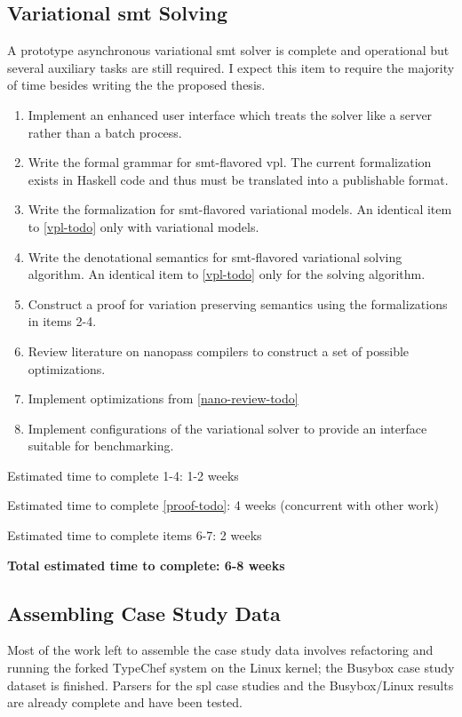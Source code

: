 \subsection{Variational \ac{smt} Solving}
A prototype asynchronous variational \ac{smt} solver is complete and operational
but several auxiliary tasks are still required. I expect this item to require
the majority of time besides writing the the proposed thesis.

\begin{enumerate}
\item\label{ui-todo} Implement an enhanced user interface which treats the
  solver like a server rather than a batch process.
\item\label{vpl-todo} Write the formal grammar for \ac{smt}-flavored \ac{vpl}.
  The current formalization exists in Haskell code and thus must be translated
  into a publishable format.
\item\label{vmodel-todo} Write the formalization for \ac{smt}-flavored variational models. An
  identical item to \autoref{vpl-todo} only with variational models.
\item \label{solve-todo} Write the denotational semantics for \ac{smt}-flavored
  variational solving algorithm. An identical item to \autoref{vpl-todo} only
  for the solving algorithm.
\item \label{proof-todo} Construct a proof for variation preserving semantics
  using the formalizations in items 2-4.
\item\label{nano-review-todo} Review literature on nanopass compilers to
  construct a set of possible optimizations.
\item\label{opts-todo} Implement optimizations from \autoref{nano-review-todo}
\item \label{conf-todo} Implement configurations of the variational solver to
  provide an interface suitable for benchmarking.
\end{enumerate}

Estimated time to complete 1-4: 1-2 weeks

Estimated time to complete \autoref{proof-todo}: 4 weeks (concurrent with other work)

Estimated time to complete items 6-7: 2 weeks

\textbf{Total estimated time to complete: 6-8 weeks}

\subsection{Assembling Case Study Data}
Most of the work left to assemble the case study data involves refactoring and
running the forked TypeChef system on the Linux kernel; the Busybox case study
dataset is finished. Parsers for the \ac{spl} case studies and the Busybox/Linux
results are already complete and have been tested.

